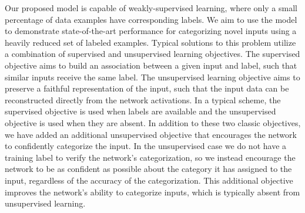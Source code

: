 Our proposed model is capable of weakly-supervised learning, where only a small percentage of data examples have corresponding labels. We aim to use the model to demonstrate state-of-the-art performance for categorizing novel inputs using a heavily reduced set of labeled examples. Typical solutions to this problem utilize a combination of supervised and unsupervised learning objectives. The supervised objective aims to build an association between a given input and label, such that similar inputs receive the same label. The unsupervised learning objective aims to preserve a faithful representation of the input, such that the input data can be reconstructed directly from the network activations. In a typical scheme, the supervised objective is used when labels are available and the unsupervised objective is used when they are absent. In addition to these two classic objectives, we have added an additional unsupervised objective that encourages the network to confidently categorize the input. In the unsupervised case we do not have a training label to verify the network’s categorization, so we instead encourage the network to be as confident as possible about the category it has assigned to the input, regardless of the accuracy of the categorization. This additional objective improves the network’s ability to categorize inputs, which is typically absent from unsupervised learning.

